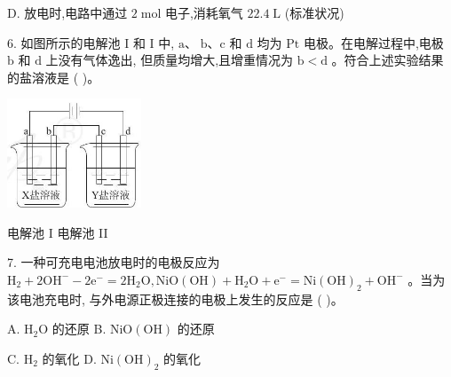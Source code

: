 \documentclass[10pt]{article}
\begin{document}
D. 放电时,电路中通过 \(2\mathrm{\;{mol}}\) 电子,消耗氧气 \({22.4}\mathrm{\;L}\) (标准状况)

6. 如图所示的电解池 \(\mathrm{I}\) 和 \(\mathrm{I}\) 中, \(\mathrm{a}\text{、}\mathrm{\;b}\text{、}\mathrm{c}\) 和 \(\mathrm{d}\) 均为 \(\mathrm{{Pt}}\) 电极。在电解过程中,电极 \(\mathrm{b}\) 和 \(\mathrm{d}\) 上没有气体逸出, 但质量均增大,且增重情况为 \(\mathrm{b} < \mathrm{d}\) 。符合上述实验结果的盐溶液是 ( )。

\begin{center}
\end{center}

\begin{center}
\includegraphics[max width=0.3\textwidth]{images/0190da9d-8bfd-732f-bc2c-0b21d0f13b91_124_297016.jpg}
\end{center}

电解池 I 电解池 II

7. 一种可充电电池放电时的电极反应为 \({\mathrm{H}}_{2} + 2{\mathrm{{OH}}}^{ - } - 2{\mathrm{e}}^{ - } = 2{\mathrm{H}}_{2}\mathrm{O},\mathrm{{NiO}}\left( \mathrm{{OH}}\right) + {\mathrm{H}}_{2}\mathrm{O} + {\mathrm{e}}^{ - } = \mathrm{{Ni}}{\left( \mathrm{{OH}}\right) }_{2} + {\mathrm{{OH}}}^{ - }\) 。当为该电池充电时, 与外电源正极连接的电极上发生的反应是 ( )。

A. \({\mathrm{H}}_{2}\mathrm{O}\) 的还原 B. \(\mathrm{{NiO}}\left( \mathrm{{OH}}\right)\) 的还原

C. \({\mathrm{H}}_{2}\) 的氧化 D. \(\mathrm{{Ni}}{\left( \mathrm{{OH}}\right) }_{2}\) 的氧化
\end{document}

